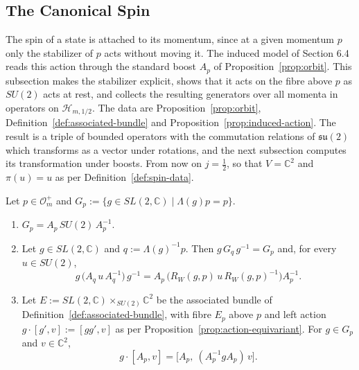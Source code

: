\subsection{The Canonical Spin}
\label{subsec:canonical-spin}

The spin of a state is attached to its momentum, since at a given momentum $p$ only the stabilizer of $p$ acts without moving it. The induced model of Section 6.4 reads this action through the standard boost $A_p$ of Proposition~\ref{prop:orbit}. This subsection makes the stabilizer explicit, shows that it acts on the fibre above $p$ as $SU(2)$ acts at rest, and collects the resulting generators over all momenta in operators on $\mathcal{H}_{m,1/2}$. The data are Proposition~\ref{prop:orbit}, Definition~\ref{def:associated-bundle} and Proposition~\ref{prop:induced-action}. The result is a triple of bounded operators with the commutation relations of $\mathfrak{su}(2)$ which transforms as a vector under rotations, and the next subsection computes its transformation under boosts. From now on $j=\frac12$, so that $V=\mathbb{C}^2$ and $\pi(u)=u$ as per Definition~\ref{def:spin-data}.

\begin{lemma}\label{lem:stabilizer}
	Let $p\in\mathcal{O}_m^+$ and $G_p:=\{g\in SL(2,\mathbb{C})\mid\Lambda(g)p=p\}$.
	\begin{enumerate}
		\item $G_p=A_p\,SU(2)\,A_p^{-1}$.
		\item Let $g\in SL(2,\mathbb{C})$ and $q:=\Lambda(g)^{-1}p$. Then $g\,G_q\,g^{-1}=G_p$ and, for every $u\in SU(2)$,
		\begin{equation*}
			g\,\big(A_q\,u\,A_q^{-1}\big)\,g^{-1}=A_p\,\big(R_W(g,p)\,u\,R_W(g,p)^{-1}\big)A_p^{-1}.
		\end{equation*}
		\item Let $E:=SL(2,\mathbb{C})\times_{SU(2)}\mathbb{C}^2$ be the associated bundle of Definition~\ref{def:associated-bundle}, with fibre $E_p$ above $p$ and left action $g\cdot[g',v]:=[gg',v]$ as per Proposition~\ref{prop:action-equivariant}. For $g\in G_p$ and $v\in\mathbb{C}^2$,
		\begin{equation*}
			g\cdot[A_p,v]=\big[A_p,\ (A_p^{-1}gA_p)\,v\big].
		\end{equation*}
	\end{enumerate}
\end{lemma}

